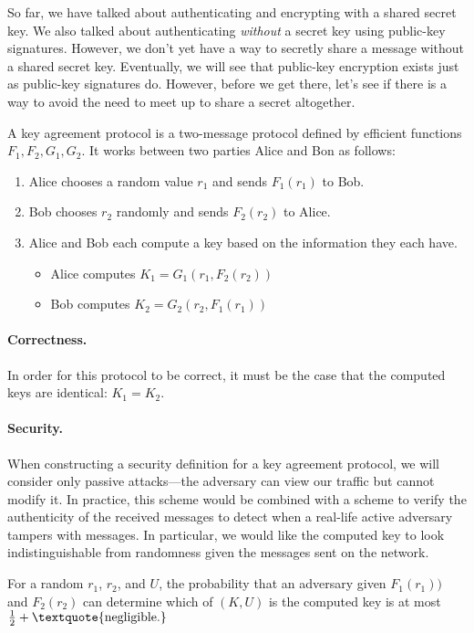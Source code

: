 So far, we have talked about authenticating and encrypting with a shared secret key. We also talked about authenticating \emph{without} a secret key using public-key signatures. However, we don't yet have a way to secretly share a message without a shared secret key. Eventually, we will see that public-key encryption exists just as public-key signatures do. However, before we get there, let's see if there is a way to avoid the need to meet up to share a secret altogether.

\begin{definition}
	A key agreement protocol is a two-message protocol defined by efficient functions $F_1, F_2, G_1, G_2$. It works between two parties Alice and Bon as follows:

	\begin{enumerate}[noitemsep]
		\item Alice chooses a random value $r_1$ and sends $F_1(r_1)$ to Bob.
		\item Bob chooses $r_2$ randomly and sends $F_2(r_2)$ to Alice.
		\item Alice and Bob each compute a key based on the information they each have.
			\begin{itemize}[noitemsep, topsep=0pt]
				\item Alice computes $K_1 = G_1(r_1, F_2(r_2))$
				\item Bob computes $K_2 = G_2(r_2, F_1(r_1))$
			\end{itemize}
	\end{enumerate}

	\paragraph{Correctness.} In order for this protocol to be correct, it must be the case that the computed keys are identical: $K_1 = K_2$.

	\paragraph{Security.} When constructing a security definition for a key agreement protocol, we will consider only passive attacks---the adversary can view our traffic but cannot modify it. In practice, this scheme would be combined with a scheme to verify the authenticity of the received messages to detect when a real-life active adversary tampers with messages. In particular, we would like the computed key to look indistinguishable from randomness given the messages sent on the network.

	For a random $r_1$, $r_2$, and $U$, the probability that an adversary given $F_1(r_1))$ and $F_2(r_2)$ can determine which of $(K, U)$ is the computed key is at most $\tfrac{1}{2} + \text{\textquote{negligible.}}$
\end{definition}

